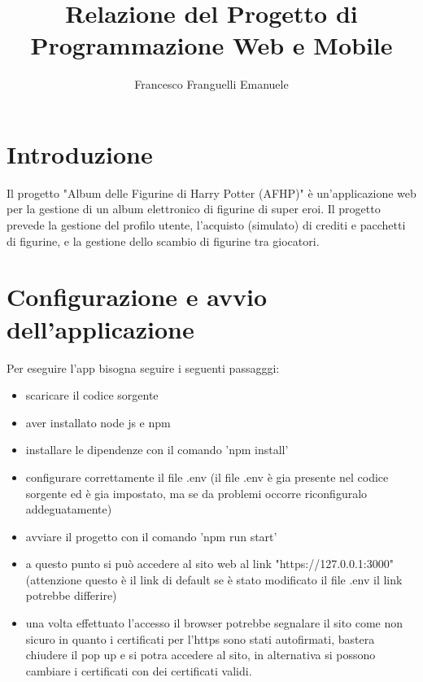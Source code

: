 \documentclass{article}
\title{Relazione del Progetto di Programmazione Web e Mobile}
\author{Francesco Franguelli Emanuele}
\begin{document}
\maketitle

\section*{Introduzione}
Il progetto "Album delle Figurine di Harry Potter (AFHP)" è un'applicazione web per la gestione di un album elettronico di figurine di super eroi. Il progetto prevede la gestione del profilo utente, l'acquisto (simulato) di crediti e pacchetti di figurine, e la gestione dello scambio di figurine tra giocatori.

\section{Configurazione e avvio dell'applicazione}
    Per eseguire l'app bisogna seguire i seguenti passagggi:
    \begin{itemize}
        \item scaricare il codice sorgente
        \item aver installato node js e npm
        \item installare le dipendenze con il comando 'npm install'
        \item configurare correttamente il file .env (il file .env è gia presente nel codice sorgente ed è gia impostato, ma se da problemi occorre riconfiguralo addeguatamente)
        \item avviare il progetto con il comando 'npm run start'
        \item a questo punto si può accedere al sito web al link "https://127.0.0.1:3000" (attenzione questo è il link di default se è stato modificato il file .env il link potrebbe differire)
        \item una volta effettuato l'accesso il browser potrebbe segnalare il sito come non sicuro in quanto i certificati per l'https sono stati autofirmati, bastera chiudere il pop up e si potra accedere al sito, in alternativa si possono cambiare i certificati con dei certificati validi.
    \end{itemize}
\end{document}
